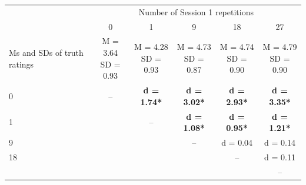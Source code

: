 \documentclass[border=1mm]{standalone}
\begin{document}
\begin{table}[!h]
\centering
\begin{tabular}{lccccc}
\toprule
\multicolumn{1}{c}{ } & \multicolumn{5}{c}{Number of Session 1 repetitions} \\
\cmidrule(l{3pt}r{3pt}){2-6}
  & 0 & 1 & 9 & 18 & 27\\
\midrule
Ms and SDs of truth ratings & \makecell{M = 3.64 \\ SD = 0.93} & \makecell{M = 4.28 \\ SD = 0.93} & \makecell{M = 4.73 \\ SD = 0.87} & \makecell{M = 4.74 \\ SD = 0.90} & \makecell{M = 4.79 \\ SD = 0.90}\\
0 & – & \textbf{d = 1.74*} & \textbf{d = 3.02*} & \textbf{d = 2.93*} & \textbf{d = 3.35*}\\
1 &  & – & \textbf{d = 1.08*} & \textbf{d = 0.95*} & \textbf{d = 1.21*}\\
9 &  &  & – & d = 0.04 & d = 0.14\\
18 &  &  &  & – & d = 0.11\\
\addlinespace
27 &  &  &  &  & –\\
\bottomrule
\end{tabular}
\end{table}
\end{document}
